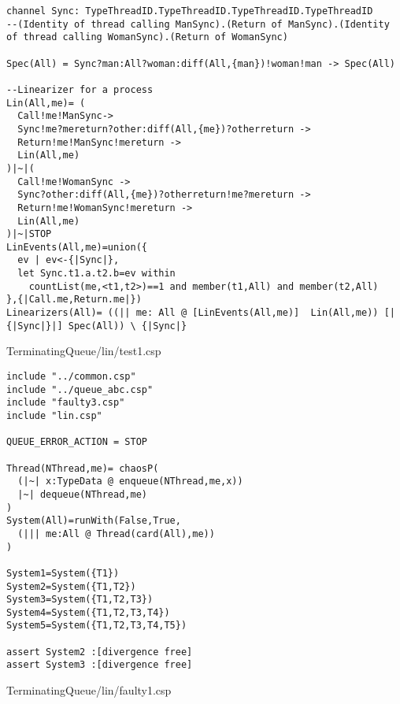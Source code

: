 \begin{lstlisting}
channel Sync: TypeThreadID.TypeThreadID.TypeThreadID.TypeThreadID
--(Identity of thread calling ManSync).(Return of ManSync).(Identity of thread calling WomanSync).(Return of WomanSync)

Spec(All) = Sync?man:All?woman:diff(All,{man})!woman!man -> Spec(All)

--Linearizer for a process
Lin(All,me)= (
  Call!me!ManSync->
  Sync!me?mereturn?other:diff(All,{me})?otherreturn ->
  Return!me!ManSync!mereturn ->
  Lin(All,me)
)|~|(
  Call!me!WomanSync ->
  Sync?other:diff(All,{me})?otherreturn!me?mereturn ->
  Return!me!WomanSync!mereturn ->
  Lin(All,me)
)|~|STOP
LinEvents(All,me)=union({
  ev | ev<-{|Sync|},
  let Sync.t1.a.t2.b=ev within
    countList(me,<t1,t2>)==1 and member(t1,All) and member(t2,All)
},{|Call.me,Return.me|})
Linearizers(All)= ((|| me: All @ [LinEvents(All,me)]  Lin(All,me)) [|{|Sync|}|] Spec(All)) \ {|Sync|}

\end{lstlisting}
TerminatingQueue/lin/test1.csp
\begin{lstlisting}
include "../common.csp"
include "../queue_abc.csp"
include "faulty3.csp"
include "lin.csp"

QUEUE_ERROR_ACTION = STOP

Thread(NThread,me)= chaosP(
  (|~| x:TypeData @ enqueue(NThread,me,x))
  |~| dequeue(NThread,me)
)
System(All)=runWith(False,True,
  (||| me:All @ Thread(card(All),me)) 
)

System1=System({T1})
System2=System({T1,T2})
System3=System({T1,T2,T3})
System4=System({T1,T2,T3,T4})
System5=System({T1,T2,T3,T4,T5})

assert System2 :[divergence free]
assert System3 :[divergence free]

\end{lstlisting}
TerminatingQueue/lin/faulty1.csp
